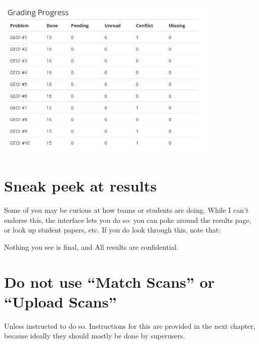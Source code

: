 \begin{center}
	\includegraphics[width=0.8\textwidth]{images/progress.png}
\end{center}

\section{Sneak peek at results}
Some of you may be curious at how teams or students are doing.
While I can't endorse this, the interface lets you do so:
you can poke around the results page,
or look up student papers, etc.
If you do look through this, note that:
\begin{itemize}
	\ii Nothing you see is final, and
	\ii All results are confidential.
\end{itemize}

\section{Do not use ``Match Scans'' or ``Upload Scans''}
Unless instructed to do so.
Instructions for this are provided in the next chapter,
because ideally they should mostly be done by superusers.
